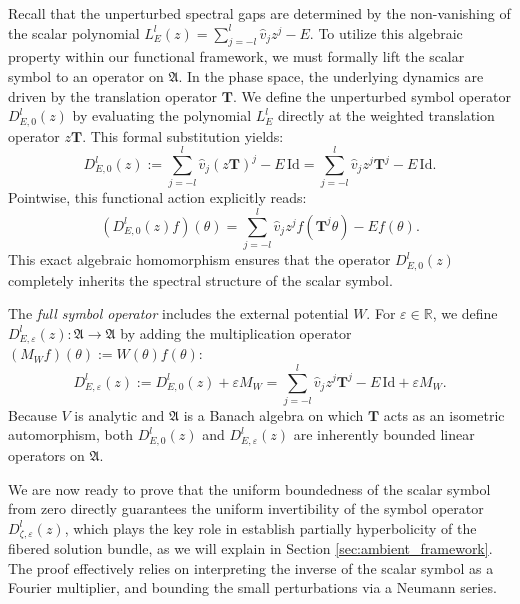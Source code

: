 \documentclass[reqno,11pt]{amsart}
\newcommand{\R}{{\mathbb R}}
\begin{document}
 

Recall that the unperturbed spectral gaps are  determined by the non-vanishing of the scalar  polynomial $L_E^{l}(z) = \sum_{j=-l}^{l} \hat{v}_j z^j - E$. 
To utilize this algebraic property within our functional framework, we must formally lift the scalar symbol to an operator on $\mathfrak A$.
In the phase space, the underlying dynamics are driven by the translation operator $\mathbf T $. We define the unperturbed symbol operator $D_{E,0}^{l}(z)$ by evaluating the polynomial $L_E^l$ directly at the weighted translation operator $z\mathbf T$. This formal substitution yields:
$$
D_{E,0}^{l}(z) := 
\sum_{j=-l}^{l} \hat{v}_j (z\mathbf T)^j - E \,\mathrm{Id}=\sum_{j=-l}^{l} \hat{v}_j z^j \mathbf T^j - E \,\mathrm{Id}.
$$
Pointwise, this functional action explicitly reads:
$$
(D_{E,0}^{l}(z)f)(\theta) = \sum_{j=-l}^{l} \hat{v}_j z^j f(\mathbf T^j\theta) - E f(\theta).
$$
This exact algebraic homomorphism ensures that the operator $D_{E,0}^{l}(z)$ completely inherits the spectral structure of the scalar symbol.


The \textit{full symbol operator} includes the external potential $W$. For $\varepsilon \in \R$, we define $D_{E,\varepsilon}^{l}(z) : \mathfrak A \to \mathfrak A$ by adding the multiplication operator  $(M_W f)(\theta):=W(\theta)f(\theta)$: 
\begin{equation}\label{full-sym}
    D_{E,\varepsilon}^{l}(z):=D_{E,0}^{l}(z) + \varepsilon M_W
=\sum_{j=-l}^{l} \hat{v}_j z^j \mathbf T^j - E \,\mathrm{Id} + \varepsilon M_W.
\end{equation}
Because $V$ is analytic and $\mathfrak A$ is a Banach algebra on which $\mathbf T$ acts as an isometric automorphism, both $D_{E,0}^{l}(z)$ and $D_{E,\varepsilon}^{l}(z)$ are inherently bounded linear operators on $\mathfrak A$.








We are now ready to prove that the uniform boundedness of the scalar symbol from zero directly guarantees the uniform invertibility of the symbol operator $D_{\zeta,\varepsilon}^{l}(z)$, which plays the key role in establish partially hyperbolicity of the fibered solution bundle, as we will explain in Section \ref{sec:ambient_framework}.  The proof effectively relies on interpreting the inverse of the scalar symbol as a Fourier multiplier, and bounding the small perturbations via a Neumann series.
\end{document}
